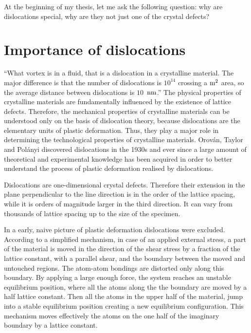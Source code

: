 At the beginning of my thesis, let me ask the following question: why are dislocations special, why are they not just one of the crystal defects?

\section{Importance of dislocations} %

``What vortex is in a fluid, that is a dislocation in a crystalline material. The major difference is that the number of dislocations is $10^{14}$ crossing a ${\rm{m}}^2$ area, so the average distance between dislocations is $10$~${\rm{nm}}$.''
The physical properties of crystalline materials are fundamentally influenced by the existence of lattice defects. Therefore, the mechanical properties of crystalline materials can be understood only on the basis of dislocation theory, because dislocations are the elementary units of plastic deformation. Thus, they play a major role in determining the technological properties of crystalline materials. Orován, Taylor and Polányi discovered dislocations in the 1930s and ever since a large amount of theoretical and experimental knowledge has been acquired in order to better understand the process of plastic deformation realised by dislocations.

Dislocations are one-dimensional crystal defects. Therefore their extension in the plane perpendicular to the line direction is in the order of the lattice spacing, while it is orders of magnitude larger in the third direction. It can vary from thousands of lattice spacing up to the size of the specimen.

In a early, naive picture of plastic deformation dislocations were excluded. According to a simplified mechanism, in case of an applied external stress, a part of the material is moved in the direction of the shear stress by a fraction of the lattice constant, with a parallel shear, and the boundary between the moved and untouched regions. The atom-atom bondings are distorted only along this boundary. By applying a large enough force, the system reaches an unstable equilibrium position, where all the atoms along the the boundary are moved by a half lattice constant. Then all the atoms in the upper half of the material, jump into a stable equilibrium position creating a new equilibrium configuration. This mechanism moves effectively the atoms on the one half of the imaginary boundary by a lattice constant.

